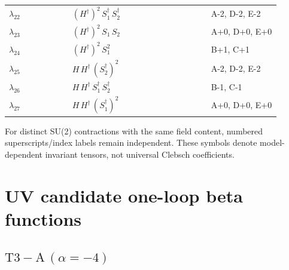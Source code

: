 \documentclass[9pt,a4paper]{article}
\begin{document}
\begin{longtable}{@{}p{0.21\linewidth}p{0.46\linewidth}p{0.23\linewidth}@{}}
$\lambda_{22}$ & $\left(H^\dagger\right)^{2}\, S_1^\dagger\, S_2^\dagger$ & A-2, D-2, E-2 \\
$\lambda_{23}$ & $\left(H^\dagger\right)^{2}\, S_1\, S_2$ & A+0, D+0, E+0 \\
$\lambda_{24}$ & $\left(H^\dagger\right)^{2}\, S_1^{2}$ & B+1, C+1 \\
$\lambda_{25}$ & $H\, H^\dagger\, \left(S_2^\dagger\right)^{2}$ & A-2, D-2, E-2 \\
$\lambda_{26}$ & $H\, H^\dagger\, S_1^\dagger\, S_2^\dagger$ & B-1, C-1 \\
$\lambda_{27}$ & $H\, H^\dagger\, \left(S_1^\dagger\right)^{2}$ & A+0, D+0, E+0 \\
\bottomrule
\end{longtable}
For distinct SU(2) contractions with the same field content, numbered superscripts/index labels remain independent. These symbols denote model-dependent invariant tensors, not universal Clebsch coefficients.
\clearpage
\section*{UV candidate one-loop beta functions}
\subsection*{$ \mathrm{T3-A}\,(\alpha=-4) $}
\medskip
\noindent{}\par
\noindent{}\par
\noindent{}\par
\noindent{}\par

\medskip
\noindent{}\par
\noindent{}\par
\noindent{}\par
\noindent{}\par
\noindent{}\par
\end{document}

